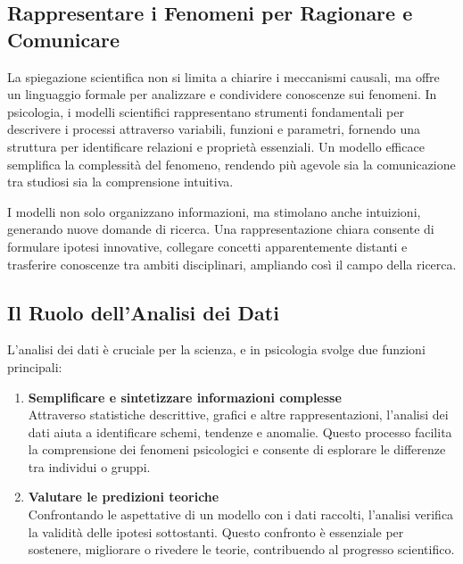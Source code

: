 \documentclass[
  letterpaper,
]{krantz}
\begin{document}
\subsection{Rappresentare i Fenomeni per Ragionare e
Comunicare}\label{rappresentare-i-fenomeni-per-ragionare-e-comunicare}

La spiegazione scientifica non si limita a chiarire i meccanismi
causali, ma offre un linguaggio formale per analizzare e condividere
conoscenze sui fenomeni. In psicologia, i modelli scientifici
rappresentano strumenti fondamentali per descrivere i processi
attraverso variabili, funzioni e parametri, fornendo una struttura per
identificare relazioni e proprietà essenziali. Un modello efficace
semplifica la complessità del fenomeno, rendendo più agevole sia la
comunicazione tra studiosi sia la comprensione intuitiva.

I modelli non solo organizzano informazioni, ma stimolano anche
intuizioni, generando nuove domande di ricerca. Una rappresentazione
chiara consente di formulare ipotesi innovative, collegare concetti
apparentemente distanti e trasferire conoscenze tra ambiti disciplinari,
ampliando così il campo della ricerca.

\subsection{Il Ruolo dell'Analisi dei
Dati}\label{il-ruolo-dellanalisi-dei-dati}

L'analisi dei dati è cruciale per la scienza, e in psicologia svolge due
funzioni principali:

\begin{enumerate}
\def\labelenumi{\arabic{enumi}.}
\item
  \textbf{Semplificare e sintetizzare informazioni complesse}\\
  Attraverso statistiche descrittive, grafici e altre rappresentazioni,
  l'analisi dei dati aiuta a identificare schemi, tendenze e anomalie.
  Questo processo facilita la comprensione dei fenomeni psicologici e
  consente di esplorare le differenze tra individui o gruppi.
\item
  \textbf{Valutare le predizioni teoriche}\\
  Confrontando le aspettative di un modello con i dati raccolti,
  l'analisi verifica la validità delle ipotesi sottostanti. Questo
  confronto è essenziale per sostenere, migliorare o rivedere le teorie,
  contribuendo al progresso scientifico.
\end{enumerate}
\end{document}
